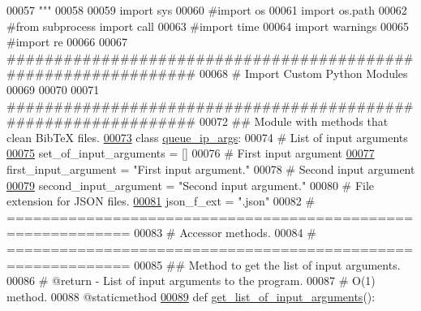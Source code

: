 \begin{DoxyCode}
00057 \textcolor{stringliteral}{"""}
00058 
00059 \textcolor{keyword}{import} sys
00060 \textcolor{comment}{#import os}
00061 \textcolor{keyword}{import} os.path
00062 \textcolor{comment}{#from subprocess import call}
00063 \textcolor{comment}{#import time}
00064 \textcolor{keyword}{import} warnings
00065 \textcolor{comment}{#import re}
00066 
00067 \textcolor{comment}{###############################################################}
00068 \textcolor{comment}{#   Import Custom Python Modules}
00069 
00070 
00071 \textcolor{comment}{###############################################################}
00072 \textcolor{comment}{##  Module with methods that clean BibTeX files.}
\hypertarget{queue__ip__arguments_8py_source_l00073}{}\hyperlink{classutilities_1_1queue__ip__arguments_1_1queue__ip__args}{00073} \textcolor{keyword}{class }\hyperlink{classutilities_1_1queue__ip__arguments_1_1queue__ip__args}{queue\_ip\_args}:
00074     \textcolor{comment}{#   List of input arguments}
\hypertarget{queue__ip__arguments_8py_source_l00075}{}\hyperlink{classutilities_1_1queue__ip__arguments_1_1queue__ip__args_acc8e7685be71a7f95ede7c980355c9f3}{00075}     set\_of\_input\_arguments = []
00076     \textcolor{comment}{#   First input argument}
\hypertarget{queue__ip__arguments_8py_source_l00077}{}\hyperlink{classutilities_1_1queue__ip__arguments_1_1queue__ip__args_a14394c9820086e09d5b926d9910a180f}{00077}     first\_input\_argument = \textcolor{stringliteral}{"First input argument."}
00078     \textcolor{comment}{#   Second input argument}
\hypertarget{queue__ip__arguments_8py_source_l00079}{}\hyperlink{classutilities_1_1queue__ip__arguments_1_1queue__ip__args_a0b179a70c0e57de2794d0d532e534c9c}{00079}     second\_input\_argument = \textcolor{stringliteral}{"Second input argument."}
00080     \textcolor{comment}{#   File extension for JSON files.}
\hypertarget{queue__ip__arguments_8py_source_l00081}{}\hyperlink{classutilities_1_1queue__ip__arguments_1_1queue__ip__args_a8d93f9ade7608583602a9948c0d744f7}{00081}     json\_f\_ext = \textcolor{stringliteral}{".json"}
00082     \textcolor{comment}{# ============================================================}
00083     \textcolor{comment}{#   Accessor methods.}
00084     \textcolor{comment}{# ============================================================}
00085     \textcolor{comment}{##  Method to get the list of input arguments.}
00086     \textcolor{comment}{#   @return - List of input arguments to the program.}
00087     \textcolor{comment}{#   O(1) method.}
00088     @staticmethod
\hypertarget{queue__ip__arguments_8py_source_l00089}{}\hyperlink{classutilities_1_1queue__ip__arguments_1_1queue__ip__args_a1ace4b3c7b9a9e97a872c3a04337442c}{00089}     \textcolor{keyword}{def }\hyperlink{classutilities_1_1queue__ip__arguments_1_1queue__ip__args_a1ace4b3c7b9a9e97a872c3a04337442c}{get\_list\_of\_input\_arguments}():

\end{DoxyCode}
